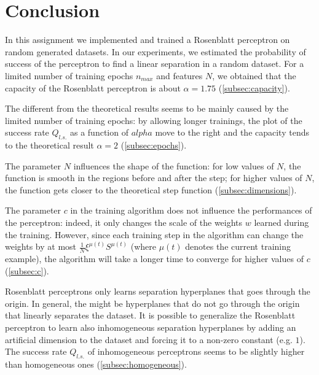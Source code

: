 \section{Conclusion}

In this assignment we implemented and trained a Rosenblatt perceptron on random generated datasets.
In our experiments, we estimated the probability of success of the perceptron to find a linear separation in a random dataset.
For a limited number of training epochs $n_{max}$ and features $N$, we obtained that the capacity of the Rosenblatt perceptron is about $\alpha = 1.75$ (\cref{subsec:capacity}).

The different from the theoretical results seems to be mainly caused by the limited number of training epochs:
by allowing longer trainings, the plot of the success rate $Q_{l.s.}$ as a function of $alpha$ move to the right and the capacity tends to the theoretical result $\alpha = 2$ (\cref{subsec:epochs}).

The parameter $N$ influences the shape of the function:
for low values of $N$, the function is smooth in the regions before and after the step;
for higher values of $N$, the function gets closer to the theoretical step function (\cref{subsec:dimensions}).

The parameter $c$ in the training algorithm does not influence the performances of the perceptron:
indeed, it only changes the scale of the weights $w$ learned during the training.
However, since each training step in the algorithm can change the weights by at most $\frac{1}{N}\xi^{\mu(t)} S^{\mu(t)}$ (where $\mu(t)$ denotes the current training example), the algorithm will take a longer time to converge for higher values of $c$ (\cref{subsec:c}).

Rosenblatt perceptrons only learns separation hyperplanes that goes through the origin.
In general, the might be hyperplanes that do not go through the origin that linearly separates the dataset.
It is possible to generalize the Rosenblatt perceptron to learn also inhomogeneous separation hyperplanes by adding an artificial dimension to the dataset and forcing it to a non-zero constant (e.g. $1$).
The success rate $Q_{l.s.}$ of inhomogeneous perceptrons seems to be slightly higher than homogeneous ones (\cref{subsec:homogeneous}).
